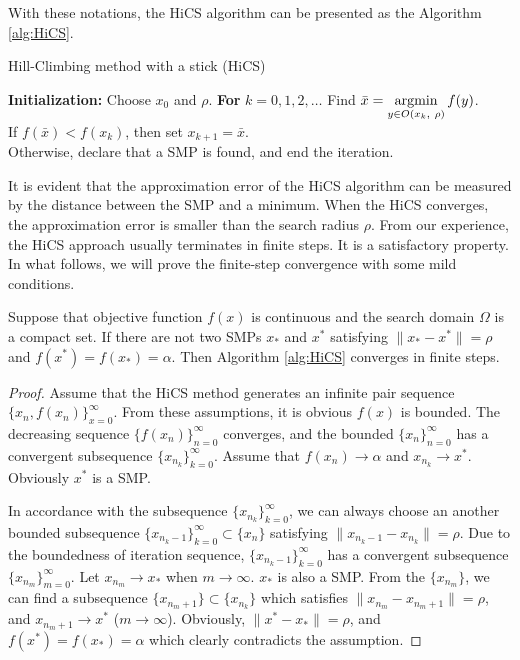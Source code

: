 With these notations, the HiCS algorithm can be presented
as the Algorithm \ref{alg:HiCS}.
\begin{algorithm}[H]
	\caption{Hill-Climbing method with a stick (HiCS)}
	\label{alg:HiCS}
\begin{algorithmic}[1]
	\STATE \textbf{Initialization:} Choose $x_0$ and $\rho$.
	\STATE \textbf{For} $k=0,1,2,\dots$
	\STATE \hspace{0.5cm} 
	Find $\bar{x}=\operatorname*{\mathrm{argmin}}\limits_{y\in O(x_k,~ \rho)} f(y)$.
			\\
	\STATE \hspace{0.5cm} If $f(\bar x)<f(x_k)$, then set $x_{k+1}= \bar{x}$.
		  \\
	\STATE \hspace{0.5cm} Otherwise, declare that 
		   a SMP is found, and end the iteration.
\end{algorithmic}
\end{algorithm}
It is evident that the approximation error of the HiCS algorithm
can be measured by the distance between the SMP and a minimum.
When the HiCS converges, the approximation error is smaller than the search radius
$\rho$.
From our experience, the HiCS approach usually terminates in 
finite steps. It is a satisfactory property. In what follows, we will
prove the finite-step convergence with some mild conditions.

\begin{theorem}
	\label{thm:fsc}
	Suppose that objective function $f(x)$ is continuous and the
	search domain $\Omega$ is a compact set.
	If there are not two SMPs $x_*$ and $x^*$ satisfying 
	$\|x_*-x^*\|=\rho$ and $f(x^*)=f(x_*)=\alpha$.
	Then Algorithm \ref{alg:HiCS} converges in finite steps.
\end{theorem}
\begin{proof}
	Assume that the HiCS method generates an infinite pair sequence
	$\{x_n, f(x_n)\}_{x=0}^{\infty}$. From these assumptions,
	it is obvious $f(x)$ is bounded. The decreasing sequence
	$\{f(x_n)\}_{n=0}^\infty$ converges, and the bounded
	$\{x_n\}_{n=0}^\infty$ has a convergent subsequence 
	$\{x_{n_k}\}_{k=0}^\infty$. Assume that $f(x_n)\rightarrow
	\alpha$ and $x_{n_k}\rightarrow x^*$. Obviously $x^*$ is a SMP.
	
	In accordance with the subsequence
	$\{x_{n_k}\}_{k=0}^\infty$, we can always choose an another
	bounded subsequence $\{x_{n_k -1}\}_{k=0}^\infty \subset
	\{x_n\}$ satisfying $\|x_{n_k - 1}-x_{n_k}\|=\rho$. 
	Due to the boundedness of iteration
	sequence, $\{x_{n_k-1}\}_{k=0}^\infty$ has a convergent
	subsequence $\{x_{n_{m}}\}_{m=0}^\infty$. Let $x_{n_m}
	\rightarrow x_*$ when $m\rightarrow \infty$. $x_*$ is also a SMP.
	From the $\{x_{n_m}\}$, we can find a subsequence
	$\{x_{n_{m}+1}\}\subset \{x_{n_k}\}$ which satisfies
	$\|x_{n_m}-x_{n_{m}+1}\|=\rho$, and $x_{n_{m}+1}\rightarrow x^*$
	($m\rightarrow \infty$).
	Obviously, $\|x^*-x_*\|=\rho$, and $f(x^*)=f(x_*)=\alpha$ 
	which clearly contradicts the assumption.
\end{proof}

